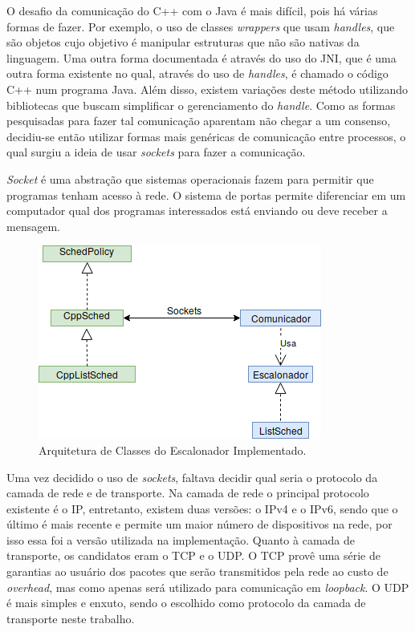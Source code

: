 O desafio da comunicação do C++ com o Java é mais difícil, pois há várias formas de fazer. Por exemplo, o uso de classes \textit{wrappers} que usam \textit{handles}, que são objetos cujo objetivo é manipular estruturas que não são nativas da linguagem\cite{CppJavaHandle}. Uma outra forma documentada é através do uso do \acrfull{JNI}, que é uma outra forma existente no qual, através do uso de \textit{handles}, é chamado o código C++ num programa Java\cite{CppJavaJNI}. Além disso, existem variações deste método utilizando bibliotecas que buscam simplificar o gerenciamento do \textit{handle}. Como as formas pesquisadas para fazer tal comunicação aparentam não chegar a um consenso, decidiu-se então utilizar formas mais genéricas de comunicação entre processos, o qual surgiu a ideia de usar \textit{sockets} para fazer a comunicação.

\textit{Socket} é uma abstração que sistemas operacionais fazem para permitir que programas tenham acesso à rede. O sistema de portas permite diferenciar em um computador qual dos programas interessados está enviando ou deve receber a mensagem. %

\begin{figure}[htbp]
	\centerline{\includegraphics[scale=0.7]{img/Proposta.png}}
	\caption{Arquitetura de Classes do Escalonador Implementado.}
	\label{ArquiteturaProposta}
\end{figure}

Uma vez decidido o uso de \textit{sockets}, faltava decidir qual seria o protocolo da camada de rede e de transporte. Na camada de rede o principal protocolo existente é o \acrfull{IP}, entretanto, existem duas versões: o IPv4\cite{ipv4rfc} e o IPv6\cite{ipv6rfc}, sendo que o último é mais recente e permite um maior número de dispositivos na rede, por isso essa foi a versão utilizada na implementação. Quanto à camada de transporte, os candidatos eram o \acrshort{TCP}\cite{tcp_rfc} e o \acrshort{UDP}\cite{udp_rfc}. O \acrshort{TCP} provê uma série de garantias ao usuário dos pacotes que serão transmitidos pela rede ao custo de \textit{overhead}, mas como apenas será utilizado para comunicação em \textit{loopback}. O \acrshort{UDP} é mais simples e enxuto, sendo o escolhido como protocolo da camada de transporte neste trabalho.


